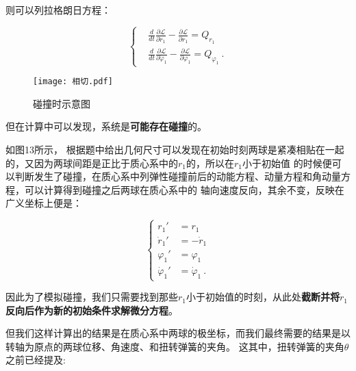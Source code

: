 \documentclass[a4paper,c5size,twoside,UTF8]{ctexart} %
\newcommand{\FS}[2]{\displaystyle\frac{#1}{#2}}
\numberwithin{equation}{section}   %
\begin{document}
则可以列拉格朗日方程：




\begin{equation}
	\left\{
	\begin{aligned}
	&\FS{d}{dt}\FS{\partial\mathcal{L}}{\partial \dot{r}_1} - \FS{\partial \mathcal{L}}{\partial r_1}=Q_{r_1}\\
	&\FS{d}{dt}\FS{\partial\mathcal{L}}{\partial \dot{\varphi}_1} - \FS{\partial \mathcal{L}}{\partial \varphi_1}=Q_{\varphi_1} ~.
    \end{aligned}
    \right.
\end{equation}



\begin{wrapfigure}{r}{0.22\textwidth} %
	\vspace{2em}
    \centering
    \texttt{[image: 相切.pdf]}
    \caption{碰撞时示意图}
\end{wrapfigure}

\vspace{1em}

但在计算中可以发现，系统是\textbf{可能存在碰撞}的。



如图13所示， 
根据题中给出几何尺寸可以发现在初始时刻两球是紧凑相贴在一起的，又因为两球间距是正比于质心系中的$r_1$的，所以在$r_1$小于初始值
的时候便可以判断发生了碰撞，在质心系中列弹性碰撞前后的动能方程、动量方程和角动量方程，可以计算得到碰撞之后两球在质心系中的
轴向速度反向，其余不变，反映在广义坐标上便是：



\begin{equation}
	\left\{
	\begin{aligned}
	r_1'&=r_1 \\
	\dot{r}_1'&=-\dot{r}_1 \\
	\varphi_1'&=\varphi_1 \\
	\dot{\varphi}_1'&=\dot{\varphi}_1   ~.
\end{aligned}
\right.
\end{equation}



因此为了模拟碰撞，我们只需要找到那些$r_1$小于初始值的时刻，从此处\textbf{截断并将$\dot{r}_1$反向后作为新的初始条件求解微分方程}。

但我们这样计算出的结果是在质心系中两球的极坐标，而我们最终需要的结果是以转轴为原点的两球位移、角速度、和扭转弹簧的夹角。
这其中，扭转弹簧的夹角$\theta$之前已经提及:
\end{document}
